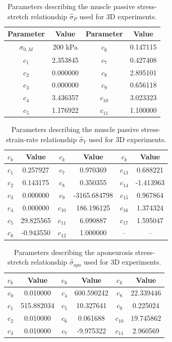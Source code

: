 \documentclass{sfuthesis}
\numberwithin{equation}{section}
\numberwithin{figure}{chapter}
\numberwithin{table}{chapter}
\theoremstyle{definition}
\begin{document}
\begin{appendices}
\begin{table}
\centering 
\begin{tabular}{|c|c|c|c|}\hline
Parameter & Value  & Parameter & Value \\\hline
$\sigma_{0,M}$ & 200 kPa & $c_6$ & 0.147115 \\\hline
$c_1$ & 2.353845 & $c_7$ & 0.427408 \\\hline
$c_2$ & 0.000000 & $c_8$ & 2.895101 \\\hline
$c_3$ & 0.000000 & $c_9$ & 0.656118 \\\hline
$c_4$ & 3.436357 & $c_{10}$ & 3.023323 \\\hline
$c_5$ & 1.176922 & $c_{11}$ & 1.100000 \\\hline
\end{tabular}
\caption{Parameters describing the muscle passive stress-stretch relationship $\widehat{\sigma}_P$ used for 3D experiments.\label{tab:coef_3D_passive}}
\end{table}

\begin{table}
\centering
\begin{tabular}{|c|c|c|c|c|c|}\hline
$c_k$ & Value & $c_k$ & Value & $c_k$ & Value \\\hline
$c_1$ & 0.257927 & $c_7$ & 0.970369 & $c_{13}$ & 0.688221 \\\hline
$c_2$ & 0.143175 & $c_8$ & 0.350355 & $c_{14}$ & -1.413963 \\\hline
$c_3$ & 0.000000 & $c_9$ & -3165.684798 & $c_{15}$ & 0.967864 \\\hline
$c_4$ & 0.000000 & $c_{10}$ & 186.196125 & $c_{16}$ & 1.374324 \\\hline
$c_5$ & 29.825565 & $c_{11}$ & 6.090887 & $c_{17}$ & 1.595047 \\\hline
$c_6$ & -0.943550 & $c_{12}$ & 1.000000 & -- & -- \\\hline
\end{tabular}
\caption{Parameters describing the muscle passive stress-strain-rate relationship $\widehat{\sigma}_V$ used for 3D experiments.\label{tab:coef_3D_velocity}}
\end{table}

\begin{table}
\centering 
\begin{tabular}{|c|c|c|c|c|c|}\hline
$c_k$ & Value & $c_k$ & Value & $c_k$ & Value \\\hline
$c_0$ & 0.010000 & $c_4$ & 600.590242 & $c_8$ & 22.339446 \\\hline
$c_1$ & 515.882034 & $c_5$ & 10.327641 & $c_9$ & 0.225024 \\\hline
$c_2$ & 0.010000 & $c_6$ & 0.061688 & $c_{10}$ & 19.745862 \\\hline
$c_3$ & 0.010000 & $c_7$ & -9.975322 & $c_{11}$ & 2.960569 \\\hline
\end{tabular}
\caption{Parameters describing the aponeurosis stress-stretch relationship $\widehat{\sigma}_{apo}$ used for 3D experiments.\label{tab:coef_3D_apo}}
\end{table}


\end{appendices}
\end{document}
